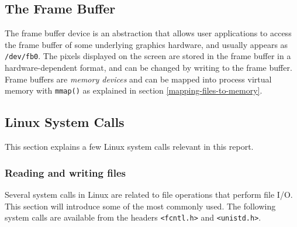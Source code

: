 \subsection{The Frame Buffer}\label{sec:the-framebuffer}
The frame buffer device is an abstraction that allows user applications to access the frame buffer of some underlying graphics hardware, and usually appears as \texttt{/dev/fb0}. The pixels displayed on the screen are stored in the frame buffer in a hardware-dependent format, and can be changed by writing to the frame buffer. Frame buffers are \emph{memory devices} and can be mapped into process virtual memory with \texttt{mmap()} as explained in section \ref{mapping-files-to-memory}.



\subsection{Linux System Calls}
This section explains a few Linux system calls relevant in this report.

\subsubsection{Reading and writing files}\label{sec:reading-and-writing-files}
Several system calls in Linux are related to file operations that perform file I/O. This section will introduce some of the most commonly used. The following system calls are available from the headers \texttt{<fcntl.h>} and \texttt{<unistd.h>}.

